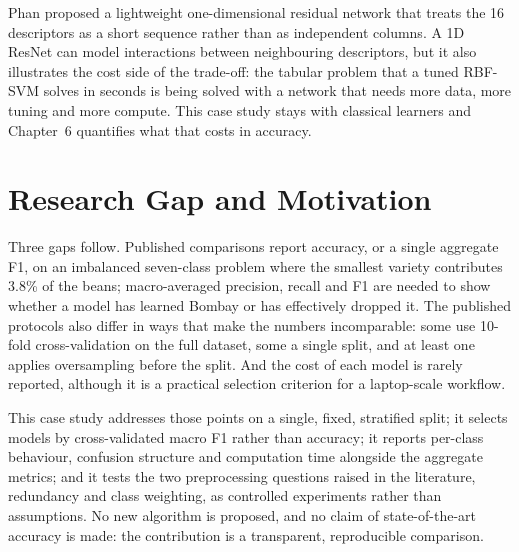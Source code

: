 Phan \cite{phan2026} proposed a lightweight one-dimensional residual network that
treats the 16 descriptors as a short sequence rather than as independent columns.
A 1D ResNet can model interactions between neighbouring descriptors, but it also
illustrates the cost side of the trade-off: the tabular problem that a tuned
RBF-SVM solves in seconds is being solved with a network that needs more data, more
tuning and more compute. This case study stays with classical learners and
Chapter~6 quantifies what that costs in accuracy.

\section{Research Gap and Motivation}

Three gaps follow. Published comparisons report accuracy, or a single aggregate F1,
on an imbalanced seven-class problem where the smallest variety contributes 3.8\%
of the beans; macro-averaged precision, recall and F1 are needed to show whether a
model has learned Bombay or has effectively dropped it. The published protocols
also differ in ways that make the numbers incomparable: some use 10-fold
cross-validation on the full dataset, some a single split, and at least one applies
oversampling before the split. And the cost of each model is rarely reported,
although it is a practical selection criterion for a laptop-scale workflow.

This case study addresses those points on a single, fixed, stratified split; it
selects models by cross-validated macro F1 rather than accuracy; it reports
per-class behaviour, confusion structure and computation time alongside the
aggregate metrics; and it tests the two preprocessing questions raised in the
literature, redundancy and class weighting, as controlled experiments rather than
assumptions. No new algorithm is proposed, and no claim of state-of-the-art
accuracy is made: the contribution is a transparent, reproducible comparison.

